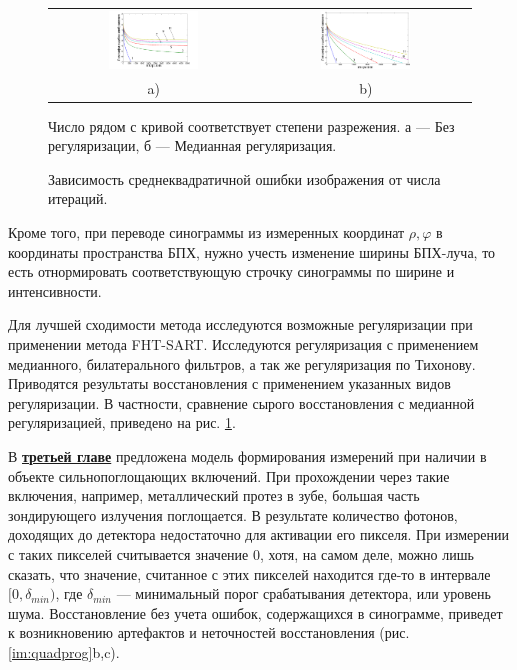 \begin{figure}
\centering
\begin{tabular}{@{}c@{}c}
    \includegraphics[width=0.45\textwidth]{Dissertation/images/part1_img/raw}
&
    \includegraphics[width=0.45\textwidth]{Dissertation/images/part1_img/medk}
\\
   \small a) & \small b)
\end{tabular}
  \caption{Зависимость среднеквадратичной ошибки изображения от числа итераций.}
Число рядом с кривой соответствует степени разрежения. а --- Без регуляризации, б --- Медианная регуляризация.
\label{fig:conv_all}
\end{figure}

Кроме того, при переводе синограммы из измеренных координат $\rho, \varphi$ в координаты пространства БПХ, нужно учесть изменение ширины БПХ-луча, то есть отнормировать соответствующую строчку синограммы по ширине и интенсивности.

Для лучшей сходимости метода исследуются возможные регуляризации при применении метода FHT-SART.
Исследуются регуляризация с применением медианного, билатерального фильтров, а так же регуляризация по Тихонову.
Приводятся результаты восстановления с применением указанных видов регуляризации.
В частности, сравнение сырого восстановления с медианной регуляризацией, приведено на рис. \ref{fig:conv_all}.


В \underline{\textbf{третьей главе}} предложена модель формирования измерений при наличии в объекте сильнопоглощающих включений.
При прохождении через такие включения, например, металлический протез в зубе, большая часть зондирующего излучения поглощается.
В результате количество фотонов, доходящих до детектора недостаточно для активации его пикселя.
При измерении с таких пикселей считывается значение 0, хотя, на самом деле, можно лишь сказать, что значение, считанное с этих пикселей находится где-то в интервале $[0, \delta_{min})$, где $\delta_{min}$ --- минимальный порог срабатывания детектора, или уровень шума.
Восстановление без учета ошибок, содержащихся в синограмме, приведет к возникновению артефактов и неточностей восстановления (рис. \ref{im:quadprog}b,c). 

